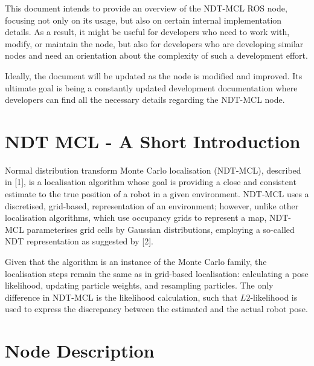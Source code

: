 \documentclass[12pt]{article}
\begin{document}
	This document intends to provide an overview of the NDT-MCL ROS node, focusing not only on its usage, but also on certain internal implementation details. As a result, it might be useful for developers who need to work with, modify, or maintain the node, but also for developers who are developing similar nodes and need an orientation about the complexity of such a development effort.

	Ideally, the document will be updated as the node is modified and improved. Its ultimate goal is being a constantly updated development documentation where developers can find all the necessary details regarding the NDT-MCL node.

	\section{NDT MCL - A Short Introduction}
	\label{sec:ndtMclIntroduction}

	Normal distribution transform Monte Carlo localisation (NDT-MCL), described in [1], is a localisation algorithm whose goal is providing a close and consistent estimate to the true position of a robot in a given environment. NDT-MCL uses a discretised, grid-based, representation of an environment; however, unlike other localisation algorithms, which use occupancy grids to represent a map, NDT-MCL parameterises grid cells by Gaussian distributions, employing a so-called NDT representation as suggested by [2].

	Given that the algorithm is an instance of the Monte Carlo family, the localisation steps remain the same as in grid-based localisation: calculating a pose likelihood, updating particle weights, and resampling particles. The only difference in NDT-MCL is the likelihood calculation, such that $L2$-likelihood is used to express the discrepancy between the estimated and the actual robot pose.

	\section{Node Description}
	\label{sec:nodeDescription}
\end{document}
